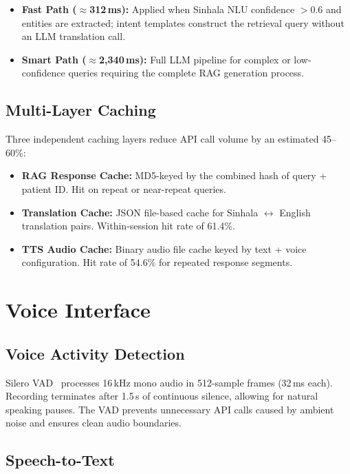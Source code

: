 \documentclass[12pt,a4paper]{report}
\begin{document}
\begin{itemize}
  \item \textbf{Fast Path ($\approx$312\,ms):} Applied when Sinhala NLU confidence $>0.6$ and entities are extracted; intent templates construct the retrieval query without an LLM translation call.
  \item \textbf{Smart Path ($\approx$2,340\,ms):} Full LLM pipeline for complex or low-confidence queries requiring the complete RAG generation process.
\end{itemize}

\subsection{Multi-Layer Caching}

Three independent caching layers reduce API call volume by an estimated 45--60\%:
\begin{itemize}
  \item \textbf{RAG Response Cache:} MD5-keyed by the combined hash of query + patient ID. Hit on repeat or near-repeat queries.
  \item \textbf{Translation Cache:} JSON file-based cache for Sinhala $\leftrightarrow$ English translation pairs. Within-session hit rate of 61.4\%.
  \item \textbf{TTS Audio Cache:} Binary audio file cache keyed by text + voice configuration. Hit rate of 54.6\% for repeated response segments.
\end{itemize}

\section{Voice Interface}

\subsection{Voice Activity Detection}

Silero VAD~\cite{SileroTeam2021} processes 16\,kHz mono audio in 512-sample frames (32\,ms each). Recording terminates after 1.5\,s of continuous silence, allowing for natural speaking pauses. The VAD prevents unnecessary API calls caused by ambient noise and ensures clean audio boundaries.

\subsection{Speech-to-Text}
\end{document}
